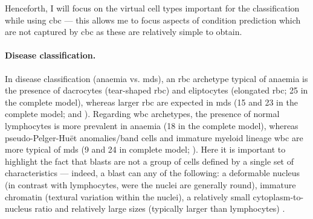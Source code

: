 \begin{figure}[!ht]
    \label{fig:wbc-disease-detection-examples-disease}
\end{figure}

Henceforth, I will focus on the virtual cell types important for the classification while using \ac{cbc} --- this allows me to focus aspects of condition prediction which are not captured by \ac{cbc} as these are relatively simple to obtain. 

\paragraph{Disease classification.} In disease classification (anaemia vs. \ac{mds}), an \ac{rbc} archetype typical of anaemia is the presence of dacrocytes (tear-shaped \ac{rbc}) and eliptocytes (elongated \ac{rbc}; 25 in the complete model), whereas larger \ac{rbc} are expected in \ac{mds} (15 and 23 in the complete model;  and ). Regarding \ac{wbc} archetypes, the presence of normal lymphocytes is more prevalent in anaemia (18 in the complete model), whereas pseudo-Pelger-Huët anomalies/band cells and immature myeloid lineage \ac{wbc} are more typical of \ac{mds} (9 and 24 in complete model; ). Here it is important to highlight the fact that blasts are not a group of cells defined by a single set of characteristics --- indeed, a blast can any of the following: a deformable nucleus (in contrast with lymphocytes, were the nuclei are generally round), immature chromatin (textural variation within the nuclei), a relatively small cytoplasm-to-nucleus ratio and relatively large sizes (typically larger than lymphocytes) \cite{Bain2004-uq,Bain2005-zg,Bain2014-oc}.

\begin{figure}[!ht]
    \label{fig:mile-vice-vcq-so-disease-classification}
\end{figure}

